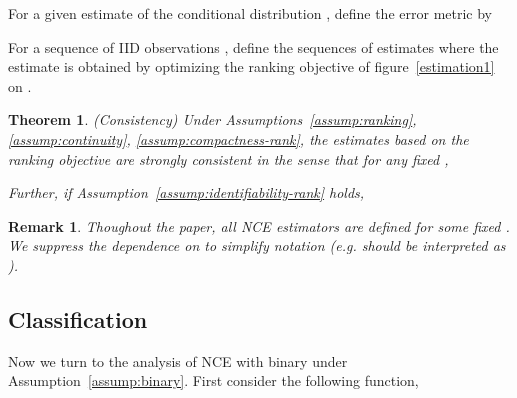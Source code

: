 \documentclass[11pt,a4paper]{article}
\newtheorem{theorem}{Theorem}[section]
\newtheorem{remark}{Remark}[section]
\newcommand{\commentout}[1]{}
\begin{document}
For a given estimate  of the conditional distribution , define the error metric  by 

For a sequence of IID observations ,  define the sequences of estimates
 where the  estimate  is obtained by optimizing the ranking objective of figure~\ref{estimation1} on .
\begin{theorem}
  (Consistency) Under Assumptions~\ref{assump:ranking}, \ref{assump:continuity}, \ref{assump:compactness-rank}, the
  estimates based on the ranking objective are strongly consistent in the
  sense that for any fixed ,
  
Further, if Assumption~\ref{assump:identifiability-rank} holds, 

\label{thm:consistency-rank}
\end{theorem}

\begin{remark}
Thoughout the paper, all NCE estimators are defined for some fixed . We suppress the dependence on  to simplify notation (e.g.  should be interpreted as ).
\end{remark}

\commentout{MJC: removing this for now, we can add back in later
\paragraph{Comparison with Importance Sampling.} 
Another way to avoid the heavy computation of MLE is to approximate the log likelihood function by  

Since  are independently sampled from the marginal distribution , we have 

So the gradient contributed by the  training example is approximated by 

To compare, the gradient contributed by the  training example in the ranking approach is, 


The difference between equation~\eqref{eq:grad-nce-ranking} and \eqref{eq:grad-is} is subtle but crucial. NCE-ranking is consistent even when  but importance sampling is generally not consistent for any finite . As  goes to infinity, the difference between the two gradients will go to 0. So in some sense, NCE-ranking corrects the bias of importance sampling.}
\subsection{Classification}
\label{sec:binary}
Now we turn to the analysis of NCE with binary  under Assumption~\ref{assump:binary}. First consider the following function, 
\end{document}
